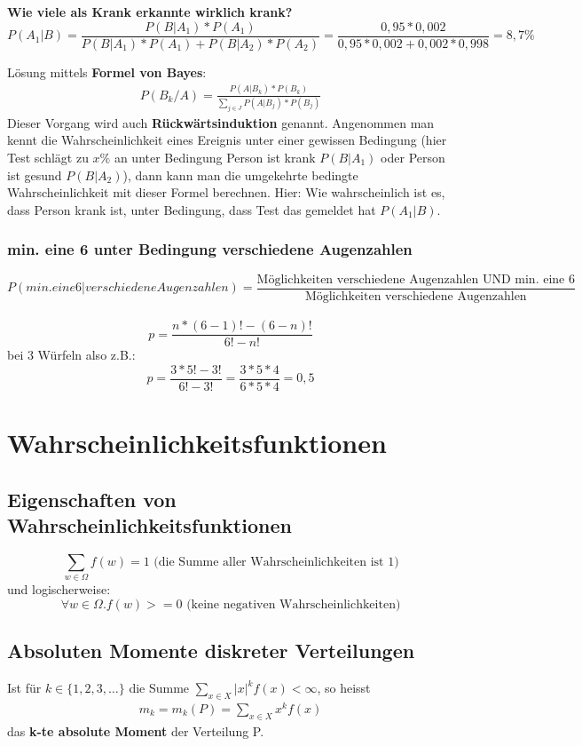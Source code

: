 \documentclass{article}
\begin{document}
\textbf{Wie viele als Krank erkannte wirklich krank?}\\
\[
	P(A_1 | B ) = \frac{P(B|A_1)*P(A_1)}
	{P(B|A_1)*P(A_1)+P(B| A_2)*P(A_2)} =
	\frac{0,95*0,002}{0,95*0,002+0,002*0,998} = 8,7\%
\]

\vspace*{10pt}

L\"osung mittels \textbf{Formel von Bayes}:
\begin{align}
	P(B_k/A) = \frac{P(A|B_k) * P(B_k)}{\sum_{j \in J} P(A|B_j) * P(B_j)}
\end{align}
Dieser Vorgang wird auch \textbf{R\"uckw\"artsinduktion} genannt. Angenommen man
kennt die Wahrscheinlichkeit eines Ereignis unter einer gewissen Bedingung (hier Test
schl\"agt zu $x\%$ an unter Bedingung Person ist krank $P(B|A_1)$ oder Person ist gesund
$P(B|A_2)$), dann kann man die umgekehrte bedingte Wahrscheinlichkeit
mit dieser Formel berechnen. Hier: Wie wahrscheinlich ist es, dass Person krank ist, unter
Bedingung, dass Test das gemeldet hat $P(A_1|B)$.

\subsubsection{min. eine 6 unter Bedingung verschiedene Augenzahlen}
\[
	P(min. eine 6|verschiedene Augenzahlen) = \frac{\text{M\"oglichkeiten verschiedene Augenzahlen
	UND min. eine 6}}{\text{M\"oglichkeiten verschiedene Augenzahlen}}
\]\\
\[
	p=\frac{n*(6-1)!-(6-n)!}{6!-n!} 
\]
bei 3 W\"urfeln also z.B.:\[
	p=\frac{3*5!-3!}{6!-3!} = \frac{3*5*4}{6*5*4} = 0,5
\]

\section{Wahrscheinlichkeitsfunktionen}
\subsection{Eigenschaften von Wahrscheinlichkeitsfunktionen}
\[ \sum_{w \in \Omega} f(w) = 1 \text{ (die Summe aller Wahrscheinlichkeiten ist 1)}\]
und logischerweise:
\[ \forall w\in\Omega . f(w)>=0 \text{ (keine negativen Wahrscheinlichkeiten)} \]
\subsection{Absoluten Momente diskreter Verteilungen}
Ist f\"ur $k \in \{1,2,3,\ldots\}$ die Summe $\sum_{x \in X} |x|^kf(x) < \infty$,
so heisst
\begin{align}
	m_k = m_k(P) = \sum_{x \in X} x^kf(x)
\end{align}
das \textbf{k-te absolute Moment} der Verteilung P.
\end{document}
